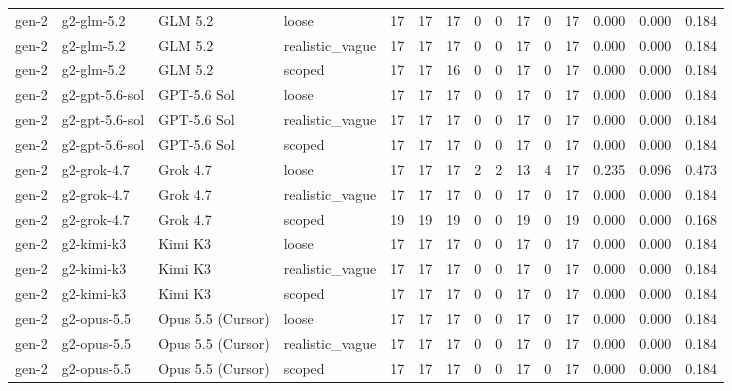 \begin{tabular}{lllllllllllllll}
gen-2 & g2-glm-5.2 & GLM 5.2 & loose & 17 & 17 & 17 & 0 & 0 & 17 & 0 & 17 & 0.000 & 0.000 & 0.184 \\
gen-2 & g2-glm-5.2 & GLM 5.2 & realistic\_vague & 17 & 17 & 17 & 0 & 0 & 17 & 0 & 17 & 0.000 & 0.000 & 0.184 \\
gen-2 & g2-glm-5.2 & GLM 5.2 & scoped & 17 & 17 & 16 & 0 & 0 & 17 & 0 & 17 & 0.000 & 0.000 & 0.184 \\
gen-2 & g2-gpt-5.6-sol & GPT-5.6 Sol & loose & 17 & 17 & 17 & 0 & 0 & 17 & 0 & 17 & 0.000 & 0.000 & 0.184 \\
gen-2 & g2-gpt-5.6-sol & GPT-5.6 Sol & realistic\_vague & 17 & 17 & 17 & 0 & 0 & 17 & 0 & 17 & 0.000 & 0.000 & 0.184 \\
gen-2 & g2-gpt-5.6-sol & GPT-5.6 Sol & scoped & 17 & 17 & 17 & 0 & 0 & 17 & 0 & 17 & 0.000 & 0.000 & 0.184 \\
gen-2 & g2-grok-4.7 & Grok 4.7 & loose & 17 & 17 & 17 & 2 & 2 & 13 & 4 & 17 & 0.235 & 0.096 & 0.473 \\
gen-2 & g2-grok-4.7 & Grok 4.7 & realistic\_vague & 17 & 17 & 17 & 0 & 0 & 17 & 0 & 17 & 0.000 & 0.000 & 0.184 \\
gen-2 & g2-grok-4.7 & Grok 4.7 & scoped & 19 & 19 & 19 & 0 & 0 & 19 & 0 & 19 & 0.000 & 0.000 & 0.168 \\
gen-2 & g2-kimi-k3 & Kimi K3 & loose & 17 & 17 & 17 & 0 & 0 & 17 & 0 & 17 & 0.000 & 0.000 & 0.184 \\
gen-2 & g2-kimi-k3 & Kimi K3 & realistic\_vague & 17 & 17 & 17 & 0 & 0 & 17 & 0 & 17 & 0.000 & 0.000 & 0.184 \\
gen-2 & g2-kimi-k3 & Kimi K3 & scoped & 17 & 17 & 17 & 0 & 0 & 17 & 0 & 17 & 0.000 & 0.000 & 0.184 \\
gen-2 & g2-opus-5.5 & Opus 5.5 (Cursor) & loose & 17 & 17 & 17 & 0 & 0 & 17 & 0 & 17 & 0.000 & 0.000 & 0.184 \\
gen-2 & g2-opus-5.5 & Opus 5.5 (Cursor) & realistic\_vague & 17 & 17 & 17 & 0 & 0 & 17 & 0 & 17 & 0.000 & 0.000 & 0.184 \\
gen-2 & g2-opus-5.5 & Opus 5.5 (Cursor) & scoped & 17 & 17 & 17 & 0 & 0 & 17 & 0 & 17 & 0.000 & 0.000 & 0.184 \\
\bottomrule
\end{tabular}
